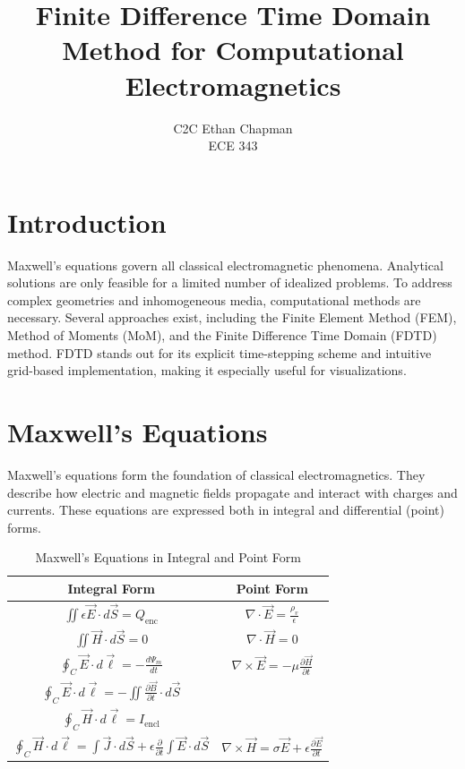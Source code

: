 \documentclass[12pt]{article}
\title{\textbf{Finite Difference Time Domain Method for Computational Electromagnetics}}
\author{C2C Ethan Chapman \\ ECE 343}
\date{}
\begin{document}
\maketitle
\begin{spacing}{1.5}

\section{Introduction}
Maxwell's equations govern all classical electromagnetic phenomena. Analytical solutions are only feasible for a limited number of idealized problems. To address complex geometries and inhomogeneous media, computational methods are necessary. Several approaches exist, including the Finite Element Method (FEM), Method of Moments (MoM), and the Finite Difference Time Domain (FDTD) method. FDTD stands out for its explicit time-stepping scheme and intuitive grid-based implementation, making it especially useful for visualizations.

\section{Maxwell's Equations}
Maxwell's equations form the foundation of classical electromagnetics. They describe how electric and magnetic fields propagate and interact with charges and currents. These equations are expressed both in integral and differential (point) forms.

\FloatBarrier

\begin{table}[h!]
\centering
\renewcommand{\arraystretch}{2.0}
\begin{tabular}{|c|c|}
\hline
\textbf{Integral Form} & \textbf{Point Form} \\
\hline
$\displaystyle \iint \epsilon \vec{E} \cdot d\vec{S} = Q_{\text{enc}}$ 
& 
$\displaystyle \nabla \cdot \vec{E} = \frac{\rho_v}{\epsilon}$ \\
\hline
$\displaystyle \iint \vec{H} \cdot d\vec{S} = 0$ 
& 
$\displaystyle \nabla \cdot \vec{H} = 0$ \\
\hline
$\displaystyle \oint_C \vec{E} \cdot d\vec{\ell} = -\frac{d\Psi_m}{dt}$ 
& 
$\displaystyle \nabla \times \vec{E} = -\mu \frac{\partial \vec{H}}{\partial t}$ \\
\hline
$\displaystyle \oint_C \vec{E} \cdot d\vec{\ell} = - \iint \frac{\partial \vec{B}}{\partial t} \cdot d\vec{S}$ 
& 
\\
\hline
$\displaystyle \oint_C \vec{H} \cdot d\vec{\ell} = I_{\text{encl}}$ 
& 
\\
\hline
$\displaystyle \oint_C \vec{H} \cdot d\vec{\ell} = \int \vec{J} \cdot d\vec{S} + \epsilon \frac{\partial}{\partial t} \int \vec{E} \cdot d\vec{S}$ 
& 
$\displaystyle \nabla \times \vec{H} = \sigma \vec{E} + \epsilon \frac{\partial \vec{E}}{\partial t}$ \\
\hline
\end{tabular}
\caption{Maxwell’s Equations in Integral and Point Form}
\end{table}


\end{spacing}
\end{document}
